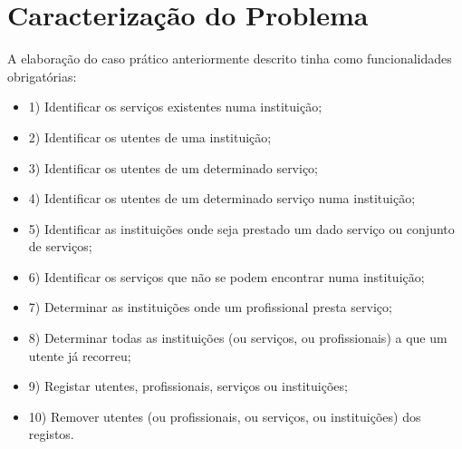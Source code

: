 \documentclass[
  oneside,
  10pt, a4paper,
  footinclude=true,
  headinclude=true,
  cleardoublepage=empty
]{scrbook}
\begin{document}
	\chapter{Caracterização do Problema}
	         A elaboração do caso prático anteriormente descrito tinha como funcionalidades obrigatórias:
\begin{itemize}
\item 1) Identificar os serviços existentes numa instituição;
\item 2) Identificar os utentes de uma instituição;
\item 3) Identificar os utentes de um determinado serviço;
\item 4) Identificar os utentes de um determinado serviço numa instituição;
\item 5) Identificar as instituições onde seja prestado um dado serviço ou conjunto de serviços;
\item 6) Identificar os serviços que não se podem encontrar numa instituição;
\item 7) Determinar as instituições onde um profissional presta serviço;
\item 8) Determinar todas as instituições (ou serviços, ou profissionais) a que um utente já recorreu;
\item 9) Registar utentes, profissionais, serviços ou instituições;
\item 10) Remover utentes (ou profissionais, ou serviços, ou instituições) dos registos.
\end{itemize}
\end{document}
